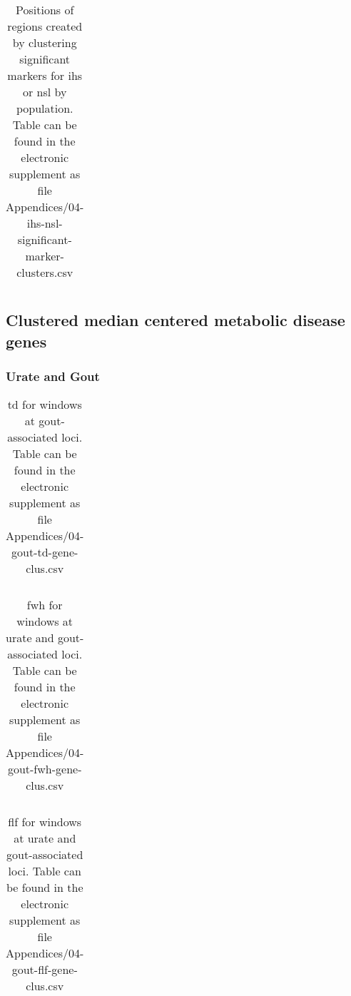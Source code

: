 \documentclass[]{report}
\begin{document}
\begin{appendices}
\begin{table}[!htb]
\caption[Positions of regions created by clustering significant markers for \acrshort{ihs} or \acrshort{nsl} by population.]{Positions of regions created by clustering significant markers for \gls{ihs} or \gls{nsl} by population. Table can be found in the electronic supplement as file Appendices/04-ihs-nsl-significant-marker-clusters.csv}
\centering
  \begin{tabular}{l l}
  \end{tabular}
  \label{tab:hapclustab}
\end{table}

\FloatBarrier

\subsection{Clustered median centered metabolic disease
genes}\label{clustered-median-centered-metabolic-disease-genes}

\subsubsection{Urate and Gout}\label{urate-and-gout}

\begin{table}[!htb]
\caption[\gls{td} for windows at gout-associated loci.]{\gls{td} for windows at gout-associated loci. Table can be found in the electronic supplement as file Appendices/04-gout-td-gene-clus.csv}
\centering
  \begin{tabular}{l l}
  \end{tabular}
  \label{tab:gouttdgeneclus}
\end{table}

\begin{table}[!htb]
\caption[\gls{fwh} for windows at urate and gout-associated loci.]{\gls{fwh} for windows at urate and gout-associated loci. Table can be found in the electronic supplement as file Appendices/04-gout-fwh-gene-clus.csv}
\centering
  \begin{tabular}{l l}
  \end{tabular}
  \label{tab:goutfwhgeneclus}
\end{table}

\begin{table}[!htb]
\caption[\gls{flf} for windows at urate and gout-associated loci.]{\gls{flf} for windows at urate and gout-associated loci. Table can be found in the electronic supplement as file Appendices/04-gout-flf-gene-clus.csv}
\centering
  \begin{tabular}{l l}
  \end{tabular}
  \label{tab:goutflfgeneclus}
\end{table}


\end{appendices}
\end{document}
